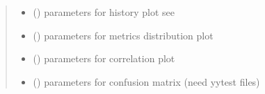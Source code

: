 \documentclass[letterpaper,10pt,english]{sphinxmanual}
\begin{document}
\begin{fulllineitems}
\begin{quote}
\begin{description}
\begin{itemize}
\item {} 
\sphinxAtStartPar
{} () \textendash{} parameters for history plot \sphinxhyphen{} see 

\item {} 
\sphinxAtStartPar
{} () \textendash{} parameters for metrics distribution plot

\item {} 
\sphinxAtStartPar
{} () \textendash{} parameters for correlation plot

\item {} 
\sphinxAtStartPar
{} () \textendash{} parameters for confusion matrix (need yytest files)

\end{itemize}

\end{description}\end{quote}

\end{fulllineitems}

\end{document}
